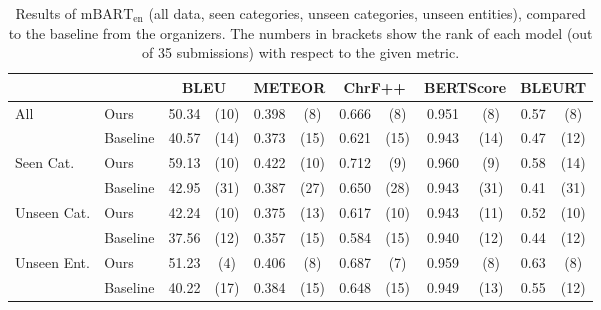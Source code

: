 \begin{table}[t]
    \footnotesize\centering
    \begin{tabular}{llcccccccccc}\toprule
                                     &          & \multicolumn{2}{c}{\bf BLEU} & \multicolumn{2}{c}{\bf METEOR} & \multicolumn{2}{c}{\bf ChrF++} & \multicolumn{2}{c}{\bf BERTScore} & \multicolumn{2}{c}{\bf BLEURT}                                     \\\midrule
        \multirow{2}{*}{All}         & Ours     & 50.34                        & (10)                           & 0.398                          & (8)                               & 0.666                          & (8)  & 0.951 & (8)  & 0.57 & (8)  \\
                                     & Baseline & 40.57                        & (14)                           & 0.373                          & (15)                              & 0.621                          & (15) & 0.943 & (14) & 0.47 & (12) \\\midrule
        \multirow{2}{*}{Seen Cat.}   & Ours     & 59.13                        & (10)                           & 0.422                          & (10)                              & 0.712                          & (9)  & 0.960 & (9)  & 0.58 & (14) \\
                                     & Baseline & 42.95                        & (31)                           & 0.387                          & (27)                              & 0.650                          & (28) & 0.943 & (31) & 0.41 & (31) \\\midrule
        \multirow{2}{*}{Unseen Cat.} & Ours     & 42.24                        & (10)                           & 0.375                          & (13)                              & 0.617                          & (10) & 0.943 & (11) & 0.52 & (10) \\
                                     & Baseline & 37.56                        & (12)                           & 0.357                          & (15)                              & 0.584                          & (15) & 0.940 & (12) & 0.44 & (12) \\\midrule
        \multirow{2}{*}{Unseen Ent.} & Ours     & 51.23                        & (4)                            & 0.406                          & (8)                               & 0.687                          & (7)  & 0.959 & (8)  & 0.63 & (8)  \\
                                     & Baseline & 40.22                        & (17)                           & 0.384                          & (15)                              & 0.648                          & (15) & 0.949 & (13) & 0.55 & (12) \\\bottomrule
    \end{tabular}
    \caption[Results of our English model compared to the baseline.]{Results of $\text{mBART}_{\text{en}}$ (all data, seen categories, unseen categories, unseen entities), compared to the baseline from the organizers. The numbers in brackets show the rank of each model (out of 35 submissions) with respect to the given metric.}
    \label{tab:mbart:results-en}
\end{table}

